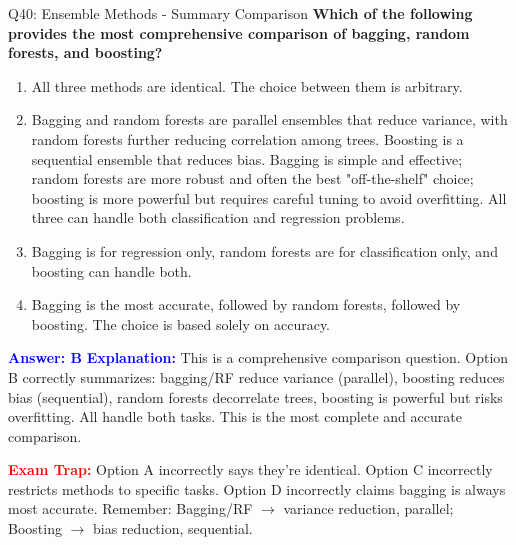 \documentclass[8pt]{beamer}
\begin{document}
	\begin{frame}{Q40: Ensemble Methods - Summary Comparison}
		\fontsize{6.5}{7.5}\selectfont
		\textbf{Which of the following provides the most comprehensive comparison of bagging, random forests, and boosting?}
		
		\begin{enumerate}
			\item All three methods are identical. The choice between them is arbitrary.
			\item Bagging and random forests are parallel ensembles that reduce variance, with random forests further reducing correlation among trees. Boosting is a sequential ensemble that reduces bias. Bagging is simple and effective; random forests are more robust and often the best "off-the-shelf" choice; boosting is more powerful but requires careful tuning to avoid overfitting. All three can handle both classification and regression problems.
			\item Bagging is for regression only, random forests are for classification only, and boosting can handle both.
			\item Bagging is the most accurate, followed by random forests, followed by boosting. The choice is based solely on accuracy.
		\end{enumerate}
		
		\vspace{0.1cm}
		\textcolor{blue}{\textbf{Answer: B}}
		\vspace{0.1cm}
		\textcolor{blue}{\textbf{Explanation:}} This is a comprehensive comparison question. Option B correctly summarizes: bagging/RF reduce variance (parallel), boosting reduces bias (sequential), random forests decorrelate trees, boosting is powerful but risks overfitting. All handle both tasks. This is the most complete and accurate comparison.
		
		\textcolor{red}{\textbf{Exam Trap:}} Option A incorrectly says they're identical. Option C incorrectly restricts methods to specific tasks. Option D incorrectly claims bagging is always most accurate. Remember: Bagging/RF $\rightarrow$ variance reduction, parallel; Boosting $\rightarrow$ bias reduction, sequential.
	\end{frame}
	
	
\end{document}
